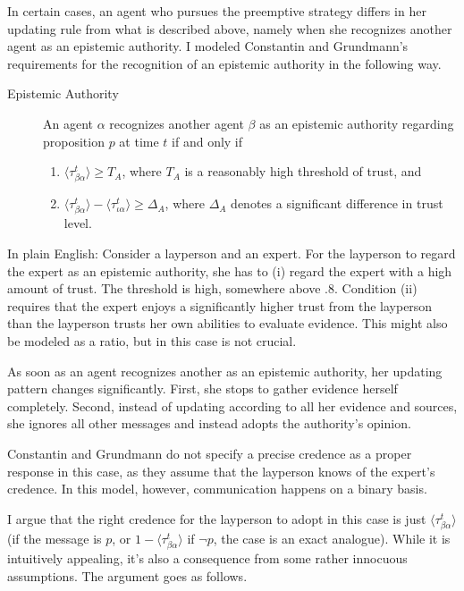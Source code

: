 \documentclass[11pt, a4paper]{article}
\begin{document}
In certain cases, an agent who pursues the preemptive strategy differs in her updating rule from what is described above, namely when she recognizes another agent as an epistemic authority. I modeled Constantin and Grundmann's requirements for the recognition of an epistemic authority in the following way. 
\begin{description} 
    \item[Epistemic Authority] An agent $\alpha$ recognizes another agent $\beta$ as an epistemic authority regarding proposition $p$ at time $t$ if and only if  
    \begin{enumerate}[label= (\roman*)]
        \item $\langle \tau^t_{\beta\alpha} \rangle \geqslant T_A$, where $T_A$ is a reasonably high threshold of trust, and
        \item $\langle \tau^t_{\beta\alpha} \rangle - \langle \tau^t_{\iota\alpha} \rangle \geqslant \Delta_A$, where $\Delta_A$ denotes a significant difference in trust level.
    \end{enumerate}


\end{description}
    In plain English: Consider a layperson and an expert. For the layperson to regard the expert as an epistemic authority, she has to (i) regard the expert with a high amount of trust. The threshold is high, somewhere above $.8$. Condition (ii) requires that the expert enjoys a significantly higher trust from the layperson than the layperson trusts her own abilities to evaluate evidence. This might also be modeled as a ratio, but in this case is not crucial.

As soon as an agent recognizes another as an epistemic authority, her updating pattern changes significantly. First, she stops to gather evidence herself completely. Second, instead of updating according to all her evidence and sources, she ignores all other messages and instead adopts the authority's opinion.

Constantin and Grundmann do not specify a precise credence as a proper response in this case, as they assume that the layperson knows of the expert's credence. In this model, however, communication happens on a binary basis.
 
I argue that the right credence for the layperson to adopt in this case is just $\langle \tau^t_{\beta\alpha} \rangle$ (if the message is $p$, or $1 - \langle \tau^t_{\beta\alpha} \rangle$ if $\neg p$, the case is an exact analogue). While it is intuitively appealing, it's also a consequence from some rather innocuous assumptions. The argument goes as follows. 
\end{document}
